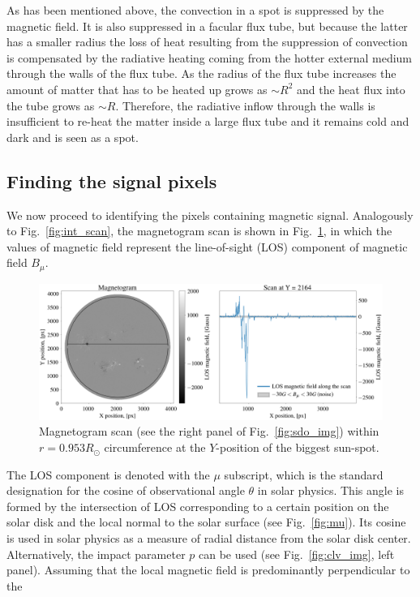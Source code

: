\documentclass[paper=a4, fontsize=11pt]{article}
\numberwithin{equation}{section}
\numberwithin{figure}{section}
\numberwithin{table}{section}
\begin{document}
As has been mentioned above, the convection in a spot is suppressed by the magnetic field.
It is also suppressed in a facular flux tube, but because the latter has a smaller radius
the loss of heat resulting from the suppression of convection is compensated by the radiative
heating coming from the hotter external medium through the walls of the flux tube.
As the radius of the flux tube increases the amount of matter that has to be heated up grows as $\sim R^2$ and
the heat flux into the tube grows as $\sim R$.
Therefore, the radiative inflow through the walls is insufficient to re-heat the matter inside a large flux tube
and it remains cold and dark and is seen as a spot.

\subsection{Finding the signal pixels}
We now proceed to identifying the pixels containing magnetic signal.
Analogously to Fig.~\ref{fig:int_scan}, the magnetogram scan is shown in Fig.~\ref{fig:mag_scan},
in which the values of magnetic field represent the line-of-sight (LOS) component of magnetic field $B_\mu$.
\begin{figure}[h!]
\centering
\includegraphics[scale=0.302]{mag_scan}
\caption[]{Magnetogram scan (see the right panel of Fig.~\ref{fig:sdo_img}) within $r = 0.953R_\odot$ circumference
           at the $Y$-position of the biggest sun-spot.}
\label{fig:mag_scan}
\end{figure}
The LOS component is denoted with the $\mu$ subscript, which is the standard designation for the cosine of
observational angle $\theta$ in solar physics.
This angle is formed by the intersection of LOS corresponding to a certain
position on the solar disk and the local normal to the solar surface (see Fig.~\ref{fig:mu}).
Its cosine is used in solar physics as a measure of radial distance from the solar disk center.
Alternatively, the impact parameter $p$ can be used (see Fig.~\ref{fig:clv_img}, left panel).
Assuming that the local magnetic field is predominantly perpendicular to the
\end{document}
